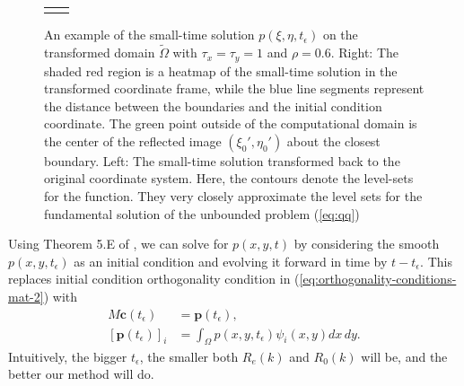 \documentclass[10pt]{article}
\begin{document}
\begin{figure}
\begin{tabular}{cc}
\begin{minipage}{0.5\textwidth}
    \end{minipage}
  \end{tabular}
  \caption{An example of the small-time solution
    $p(\xi,\eta,t_\epsilon)$ on the transformed domain
    $\tilde{\Omega}$ with $\tau_x = \tau_y = 1$ and $\rho=0.6$. Right:
    The shaded red region is a heatmap of the small-time solution in
    the transformed coordinate frame, while the blue line segments
    represent the distance between the boundaries and the initial
    condition coordinate. The green point outside of the computational
    domain is the center of the reflected image $(\xi_0', \eta_0')$
    about the closest boundary. Left: The small-time solution
    transformed back to the original coordinate system. Here, the
    contours denote the level-sets for the function. They very closely
    approximate the level sets for the fundamental solution of the
    unbounded problem (\ref{eq:qq})}
  \label{fig:step-1-small-time}
\end{figure}
Using Theorem 5.E of \cite{zeidler1995applied}, we can solve for
$p(x,y,t)$ by considering the smooth $p(x,y,t_\epsilon)$ as an initial
condition and evolving it forward in time by $t-t_\epsilon$. This
replaces initial condition orthogonality condition in
(\ref{eq:orthogonality-conditions-mat-2}) with
\begin{align}
  M \mathbf{c}(t_\epsilon) &= \mathbf{p}(t_\epsilon), \\
   [\mathbf{p}(t_\epsilon)]_i &= \displaystyle \int_\Omega p(x,y,t_\epsilon) \psi_i(x,y) dx\,dy. \nonumber
\end{align}
Intuitively, the bigger $t_\epsilon$, the smaller both $R_e(k)$ and
$R_0(k)$ will be, and the better our method will do.
\end{document}
